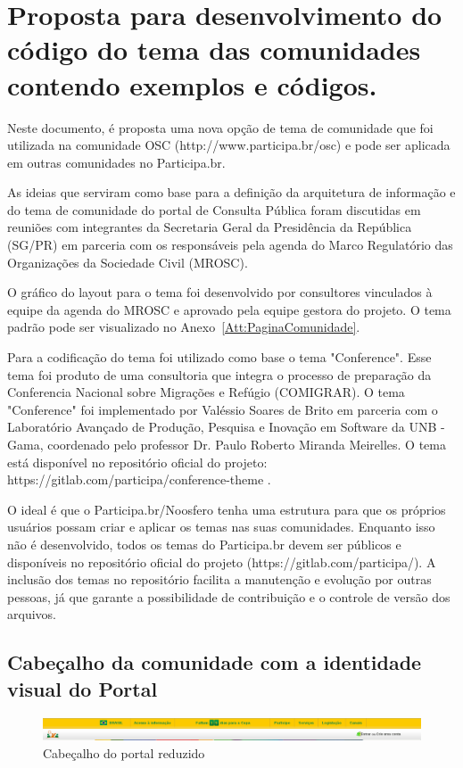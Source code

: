 \documentclass[[a4paper,11pt]{article}
\begin{document}
\section{Proposta para desenvolvimento do código do tema das 
comunidades contendo exemplos e códigos.}

Neste documento, é proposta uma nova opção de tema de comunidade que foi
utilizada na comunidade OSC (http://www.participa.br/osc) e pode ser aplicada em
outras comunidades no Participa.br.

As ideias que serviram como base para a definição da arquitetura de
informação e do tema de comunidade do portal de Consulta Pública foram
discutidas em reuniões com integrantes da Secretaria Geral da
Presidência da República (SG/PR) em parceria com os responsáveis pela agenda do
Marco Regulatório das Organizações da Sociedade Civil (MROSC).

O gráfico do layout para o tema foi desenvolvido por consultores vinculados à
equipe da agenda do MROSC e aprovado pela equipe gestora do projeto. O tema padrão
pode ser visualizado no
Anexo~\ref{Att:PaginaComunidade}.

Para a codificação do tema foi utilizado como base o tema "Conference". Esse
tema foi produto de uma consultoria que integra o processo de preparação da
Conferencia Nacional sobre Migrações e Refúgio (COMIGRAR).
O tema "Conference" foi implementado por Valéssio Soares de Brito em parceria
com o Laboratório Avançado de Produção, Pesquisa e Inovação em Software da UNB -
Gama, coordenado pelo professor Dr. Paulo Roberto Miranda Meirelles. O tema está
disponível no repositório oficial do projeto: 
https://gitlab.com/participa/conference-theme .

O ideal é que o Participa.br/Noosfero tenha uma estrutura para que os próprios
usuários possam criar e aplicar os temas nas suas comunidades. Enquanto isso não
é desenvolvido, todos os temas do Participa.br devem ser públicos e disponíveis
no repositório oficial do projeto (https://gitlab.com/participa/). A inclusão
dos temas no repositório facilita a manutenção e evolução por outras pessoas, já
que garante a possibilidade de contribuição e o controle de versão dos arquivos.

\subsection{Cabeçalho da comunidade com a identidade visual do Portal}

\begin{figure}[h]
\center
\includegraphics[scale=0.35]{cabecalho-reduzido.png}
\caption{Cabeçalho do portal reduzido}
\label{fig:cabecalho-reduzido}
\end{figure}
\end{document}
